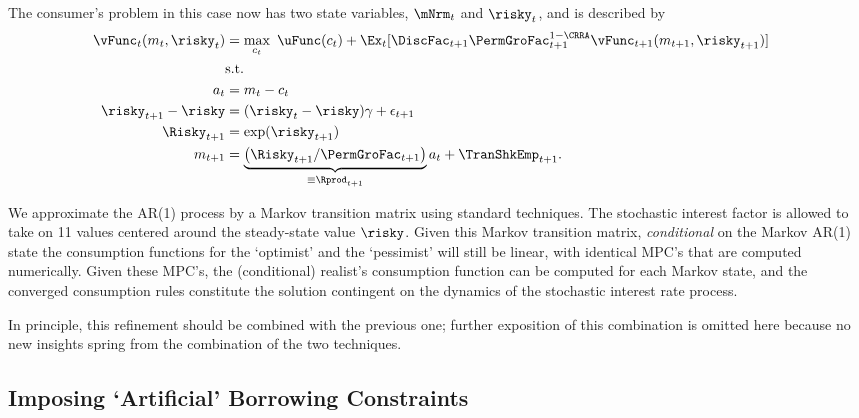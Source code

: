 \documentclass[titlepage, headings=optiontotocandhead]{\econtex}
\begin{document}
The consumer's problem in this case now has two state variables, $\mNrm_{t}$ and $\risky_{t}$, and 
is described by
\begin{equation}\begin{gathered}\begin{aligned}
      \null{\vFunc}_{t}({m}_{t},\risky_{t})  & = \max_{{c}_{t}} ~ \uFunc({c}_{t})+
      \Ex_{t}[{\DiscFac}_{t+1}\PermGroFac_{t+1}^{1-\CRRA}\null{\vFunc}_{t+1}({m}_{t+1},\risky_{t+1})] \label{vtNormRisky}
      \\         & \text{s.t.} &   \nonumber \\
      {a}_{t}    & = {m}_{t}-{c}_{t} \nonumber
      \\      \risky_{t+1}-\risky  & = (\risky_{t}-\risky)\gamma + \epsilon_{t+1} \notag
      \\      \Risky_{t+1}  & = \exp(\risky_{t+1}) \notag
      \\      {m}_{t+1}  & = \underbrace{\left(\Risky_{t+1}/\PermGroFac_{t+1}\right)}_{\equiv \Rprod_{t+1}}{a}_{t}+\TranShkEmp_{t+1} \nonumber.
    \end{aligned}\end{gathered}\end{equation}


We approximate the AR(1) process by a Markov transition matrix using standard techniques.  The stochastic interest factor is allowed to take 
on 11 values centered around the steady-state value $\risky$.  Given this Markov transition matrix,
\textit{conditional} on the Markov AR(1) state the consumption functions for the `optimist' and the `pessimist' will still be linear, 
with identical MPC's that are computed numerically.  Given these MPC's, the (conditional) realist's consumption function can be computed for each Markov state, and the converged consumption rules constitute the solution contingent on the dynamics of the stochastic
interest rate process.  

In principle, this refinement should be combined with the previous one;
further exposition of this combination is omitted here because no new
insights spring from the combination of the two techniques.



\hypertarget{Imposing-Artificial-Borrowing-Constraints}{}
\subsection{Imposing `Artificial' Borrowing Constraints}
\end{document}
